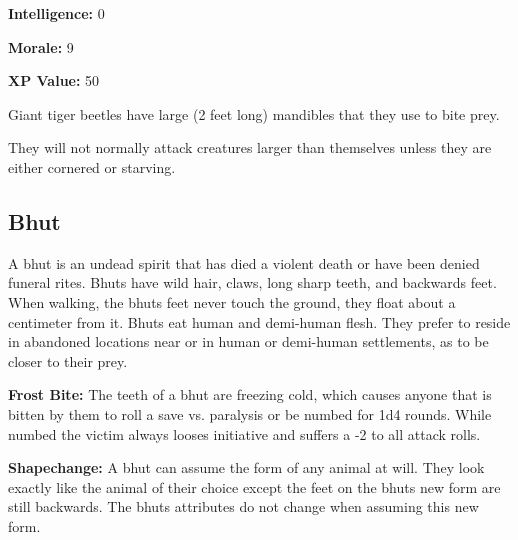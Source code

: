 \begin{multicols*}{2}
{\textbf{Intelligence:} 0

\textbf{Morale:} 9

\textbf{XP Value:} 50}

Giant tiger beetles have large (2 feet long) mandibles that they use to bite prey.

They will not normally attack creatures larger than themselves unless they are either cornered or starving.

\subsection{Bhut}

A bhut is an undead spirit that has died a violent death or have been denied funeral rites. Bhuts have wild hair, claws, long sharp teeth, and backwards feet. When walking, the bhuts feet never touch the ground, they float about a centimeter from it. Bhuts eat human and demi-human flesh. They prefer to reside in abandoned locations near or in human or demi-human settlements, as to be closer to their prey.

\textbf{Frost Bite:} The teeth of a bhut are freezing cold, which causes anyone that is bitten by them to roll a save vs. paralysis or be numbed for 1d4 rounds. While numbed the victim always looses initiative and suffers a -2 to all attack rolls.

\textbf{Shapechange:} A bhut can assume the form of any animal at will. They look exactly like the animal of their choice except the feet on the bhuts new form are still backwards. The bhuts attributes do not change when assuming this new form.


\end{multicols*}
